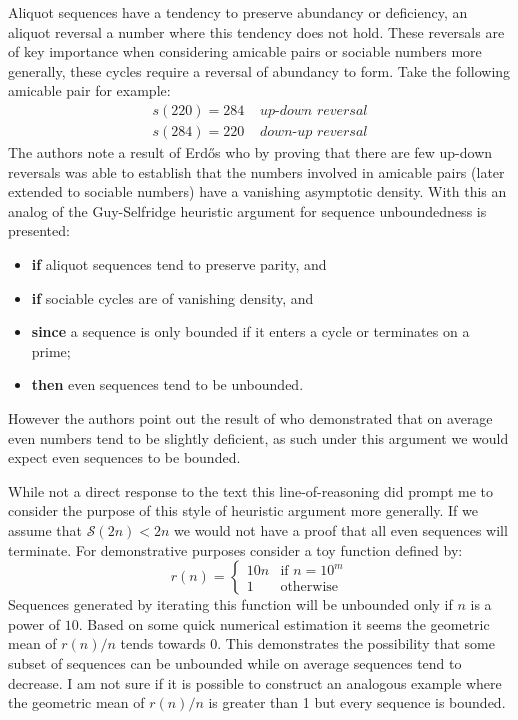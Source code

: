 \documentclass{article}
\theoremstyle{definition}
\begin{document}
Aliquot sequences have a tendency to preserve abundancy or deficiency, an aliquot reversal a number where this tendency does not hold. These reversals are of key importance when considering amicable pairs or sociable numbers more generally, these cycles require a reversal of abundancy to form. Take the following amicable pair for example:
\begin{align*}
    s(220) = 284 & \textit{ up-down reversal}\\
    s(284) = 220 & \textit{ down-up reversal}
\end{align*}
The authors note a result of Erdős who by proving that there are few up-down reversals was able to establish that the numbers involved in amicable pairs (later extended to sociable numbers) have a vanishing asymptotic density. With this an analog of the Guy-Selfridge heuristic argument for sequence unboundedness is presented:
\begin{itemize}
    \item \textbf{if} aliquot sequences tend to preserve parity, and
    \item \textbf{if} sociable cycles are of vanishing density, and
    \item \textbf{since} a sequence is only bounded if it enters a cycle or terminates on a prime;
    \item \textbf{then} even sequences tend to be unbounded.
\end{itemize}
However the authors point out the result of \cite{bosma_kane_2010} who demonstrated that on average even numbers tend to be slightly deficient, as such under this argument we would expect even sequences to be bounded.

While not a direct response to the text this line-of-reasoning did prompt me to consider the purpose of this style of heuristic argument more generally. If we assume that $\mathcal{S}(2n) < 2n$ we would not have a proof that all even sequences will terminate. For demonstrative purposes consider a toy function defined by:
$$r(n) = 
\begin{cases} 
    10n & \text{if } n = 10^m \\
    1 & \text{otherwise}
\end{cases}$$
Sequences generated by iterating this function will be unbounded only if $n$ is a power of $10$. Based on some quick numerical estimation it seems the geometric mean of $r(n) / n$ tends towards $0$. This demonstrates the possibility that some subset of sequences can be unbounded while on average sequences tend to decrease. I am not sure if it is possible to construct an analogous example where the geometric mean of $r(n)/n$ is greater than 1 but every sequence is bounded. 
\end{document}
